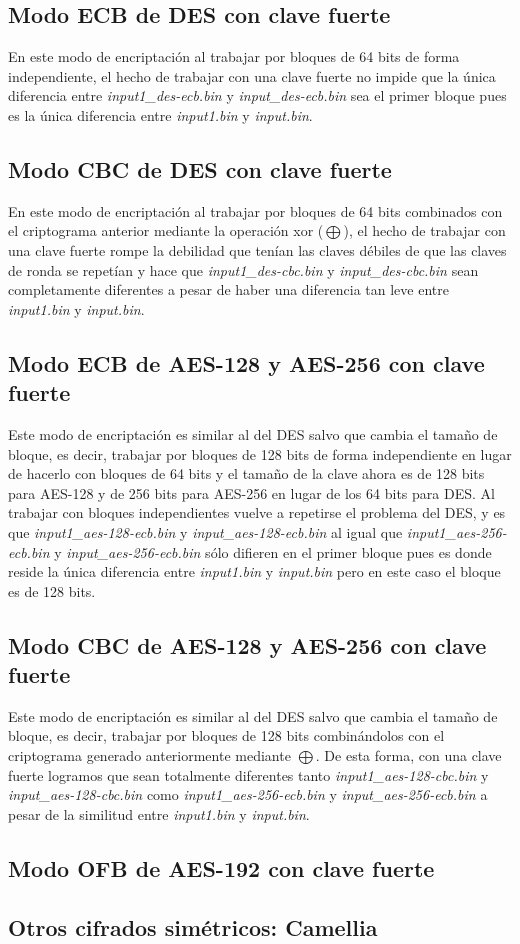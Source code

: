 \documentclass[a4paper, 11pt]{article}
\begin{document}
	\subsection{Modo ECB de DES con clave fuerte}
		En este modo de encriptación al trabajar por bloques de 64 bits de forma independiente, el hecho de trabajar con
		una clave fuerte no impide que la única diferencia entre \textit{input1\_des-ecb.bin} y \textit{input\_des-ecb.bin}
		sea el primer bloque pues es la única diferencia entre \textit{input1.bin} y \textit{input.bin}.
		
	\subsection{Modo CBC de DES con clave fuerte}
		En este modo de encriptación al trabajar por bloques de 64 bits combinados con el criptograma anterior mediante
		la operación xor ($\bigoplus$), el hecho de trabajar con una clave fuerte rompe la debilidad que tenían las claves
		débiles de que las claves de ronda se repetían y hace que \textit{input1\_des-cbc.bin} y \textit{input\_des-cbc.bin}
		sean completamente diferentes a pesar de haber una diferencia tan leve entre \textit{input1.bin} y \textit{input.bin}.
		
	\subsection{Modo ECB de AES-128 y AES-256 con clave fuerte}
		Este modo de encriptación es similar al del DES salvo que cambia el tamaño de bloque, es decir, trabajar por bloques
		de 128 bits de forma independiente en lugar de hacerlo con bloques de 64 bits y el tamaño de la clave ahora es de
		128 bits para AES-128 y de 256 bits para AES-256 en lugar de los 64 bits para DES. Al trabajar con bloques independientes
		vuelve a repetirse el problema del DES, y es que \textit{input1\_aes-128-ecb.bin} y \textit{input\_aes-128-ecb.bin}
		al igual que \textit{input1\_aes-256-ecb.bin} y \textit{input\_aes-256-ecb.bin} sólo difieren en el primer bloque
		pues es donde reside la única diferencia entre \textit{input1.bin} y \textit{input.bin} pero en este caso el bloque
		es de 128 bits.
		
	\subsection{Modo CBC de AES-128 y AES-256 con clave fuerte}
		Este modo de encriptación es similar al del DES salvo que cambia el tamaño de bloque, es decir, trabajar por bloques
		de 128 bits combinándolos con el criptograma generado anteriormente mediante $\bigoplus$. De esta forma, con una clave
		fuerte logramos que sean totalmente diferentes tanto \textit{input1\_aes-128-cbc.bin} y \textit{input\_aes-128-cbc.bin}
		como \textit{input1\_aes-256-ecb.bin} y \textit{input\_aes-256-ecb.bin} a pesar de la similitud entre \textit{input1.bin}
		y \textit{input.bin}.
		
	\subsection{Modo OFB de AES-192 con clave fuerte}
		
		
	\subsection{Otros cifrados simétricos: Camellia}
		
	
\end{document}
